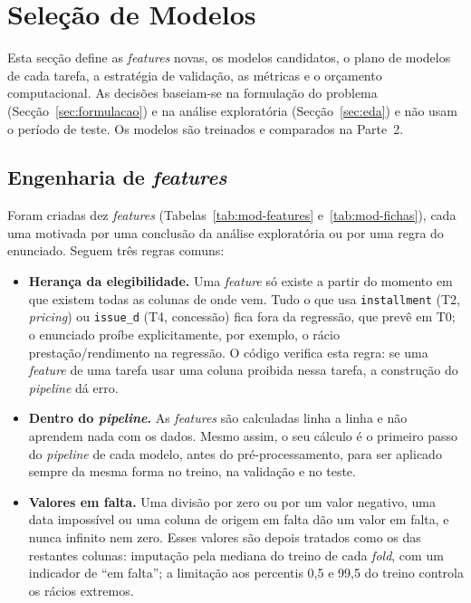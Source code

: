 \section{Seleção de Modelos}
\label{sec:modelos}

Esta secção define as \textit{features} novas, os modelos candidatos, o plano de modelos de cada tarefa, a estratégia de validação, as métricas e o orçamento computacional. As decisões baseiam-se na formulação do problema (Secção~\ref{sec:formulacao}) e na análise exploratória (Secção~\ref{sec:eda}) e não usam o período de teste. Os modelos são treinados e comparados na Parte~2.


\subsection{Engenharia de \textit{features}}
\label{sec:mod-features}

Foram criadas dez \textit{features} (Tabelas~\ref{tab:mod-features} e~\ref{tab:mod-fichas}), cada uma motivada por uma conclusão da análise exploratória ou por uma regra do enunciado. Seguem três regras comuns:

\begin{itemize}
  \item \textbf{Herança da elegibilidade.} Uma \textit{feature} só existe a partir do momento em que existem todas as colunas de onde vem. Tudo o que usa \texttt{installment} (T2, \textit{pricing}) ou \texttt{issue\_d} (T4, concessão) fica fora da regressão, que prevê em T0; o enunciado proíbe explicitamente, por exemplo, o rácio prestação/rendimento na regressão. O código verifica esta regra: se uma \textit{feature} de uma tarefa usar uma coluna proibida nessa tarefa, a construção do \textit{pipeline} dá erro.
  \item \textbf{Dentro do \textit{pipeline}.} As \textit{features} são calculadas linha a linha e não aprendem nada com os dados. Mesmo assim, o seu cálculo é o primeiro passo do \textit{pipeline} de cada modelo, antes do pré-processamento, para ser aplicado sempre da mesma forma no treino, na validação e no teste.
  \item \textbf{Valores em falta.} Uma divisão por zero ou por um valor negativo, uma data impossível ou uma coluna de origem em falta dão um valor em falta, e nunca infinito nem zero. Esses valores são depois tratados como os das restantes colunas: imputação pela mediana do treino de cada \textit{fold}, com um indicador de ``em falta''; a limitação aos percentis 0,5 e 99,5 do treino controla os rácios extremos.
\end{itemize}

